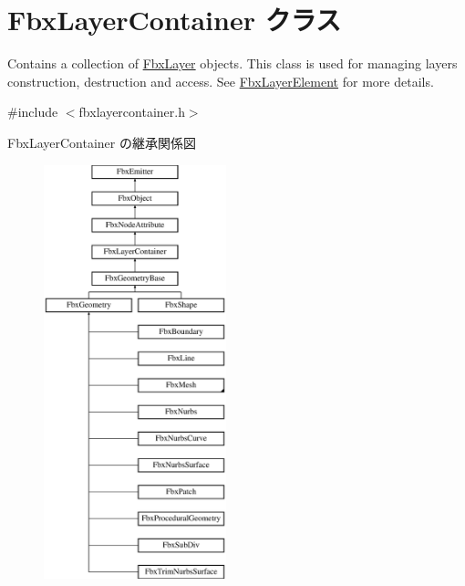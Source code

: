 \hypertarget{class_fbx_layer_container}{}\section{Fbx\+Layer\+Container クラス}
\label{class_fbx_layer_container}


Contains a collection of \hyperlink{class_fbx_layer}{Fbx\+Layer} objects. This class is used for managing layers construction, destruction and access. See \hyperlink{class_fbx_layer_element}{Fbx\+Layer\+Element} for more details.  




{\ttfamily \#include $<$fbxlayercontainer.\+h$>$}

Fbx\+Layer\+Container の継承関係図\begin{figure}[H]
\begin{center}
\leavevmode
\includegraphics[height=12.000000cm]{class_fbx_layer_container}
\end{center}
\end{figure}
